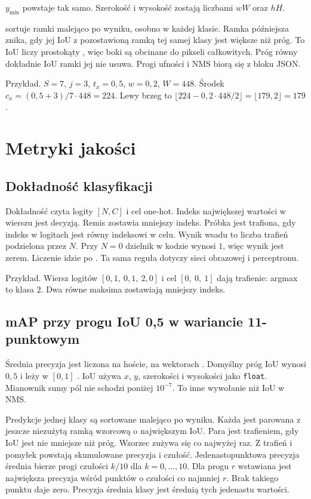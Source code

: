 \(y_{\min}\) powstaje tak samo. Szerokość i wysokość zostają liczbami \(w W\) oraz \(h H\).

 sortuje ramki malejąco po wyniku, osobno w każdej klasie. Ramka późniejsza znika, gdy jej IoU z pozostawioną ramką tej samej klasy jest większe niż próg. To IoU liczy prostokąty , więc boki są obcinane do pikseli całkowitych. Próg równy dokładnie IoU ramki jej nie usuwa. Progi ufności i NMS biorą się z bloku JSON.

Przykład. \(S = 7\), \(j = 3\), \(t_x = 0{,}5\), \(w = 0{,}2\), \(W = 448\). Środek \(c_x = (0{,}5 + 3) / 7 \cdot 448 = 224\). Lewy brzeg to \(\lfloor 224 - 0{,}2 \cdot 448 / 2 \rfloor = \lfloor 179{,}2 \rfloor = 179\).

\section{Metryki jakości}

\subsection{Dokładność klasyfikacji}

Dokładność czyta logity \([N, C]\) i cel one-hot. Indeks największej wartości w wierszu jest decyzją. Remis zostawia mniejszy indeks. Próbka jest trafiona, gdy indeks w logitach jest równy indeksowi w celu. Wynik wsadu to liczba trafień podzielona przez \(N\). Przy \(N = 0\) dzielnik w kodzie wynosi \(1\), więc wynik jest zerem. Liczenie idzie po . Ta sama reguła dotyczy sieci obrazowej i perceptronu.

Przykład. Wiersz logitów \([0{,}1,\ 0{,}1,\ 2{,}0]\) i cel \([0,\ 0,\ 1]\) dają trafienie: argmax to klasa \(2\). Dwa równe maksima zostawiają mniejszy indeks.

\subsection{mAP przy progu IoU 0,5 w wariancie 11-punktowym}

Średnia precyzja jest liczona na hoście, na wektorach . Domyślny próg IoU wynosi \(0{,}5\) i leży w \([0, 1]\) \cite{everingham2010voc}. IoU używa \(x\), \(y\), szerokości i wysokości jako \texttt{float}. Mianownik sumy pól nie schodzi poniżej \(10^{-7}\). To inne wywołanie niż IoU w NMS.

Predykcje jednej klasy są sortowane malejąco po wyniku. Każda jest parowana z jeszcze niezużytą ramką wzorcową o największym IoU. Para jest trafieniem, gdy IoU jest nie mniejsze niż próg. Wzorzec zużywa się co najwyżej raz. Z trafień i pomyłek powstają skumulowane precyzja i czułość. Jedenastopunktowa precyzja średnia bierze progi czułości \(k/10\) dla \(k = 0, \ldots, 10\). Dla progu \(r\) wstawiana jest największa precyzja wśród punktów o czułości co najmniej \(r\). Brak takiego punktu daje zero. Precyzja średnia klasy jest średnią tych jedenastu wartości.

